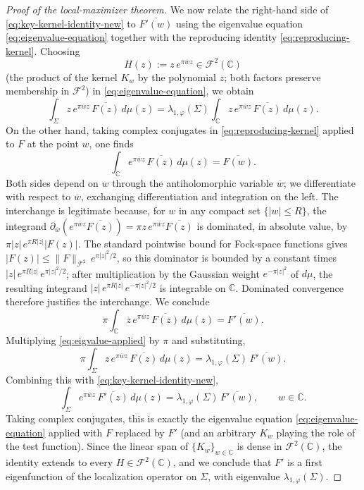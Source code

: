 \documentclass[a4paper,11pt,reqno]{amsart}
\numberwithin{equation}{section}
\theoremstyle{plain} %
\theoremstyle{definition} %
\theoremstyle{remark}
\newcommand{\C}{\mathbb{C}}
\begin{document}
\begin{proof}[Proof of the local-maximizer theorem]
We now relate the right-hand side of \eqref{eq:key-kernel-identity-new} to
\(\overline{F'(w)}\) using the eigenvalue equation
\eqref{eq:eigenvalue-equation} together with the reproducing identity
\eqref{eq:reproducing-kernel}. Choosing
\[
H(z):=z\,e^{\pi\overline w z}\in \mathcal F^2(\C)
\]
(the product of the kernel \(K_w\) by the polynomial \(z\); both factors
preserve membership in \(\mathcal F^2\)) in \eqref{eq:eigenvalue-equation}, we
obtain
\begin{equation}\label{eq:eigvalue-applied}
\int_\Sigma z\, e^{\pi \overline wz}\,\overline{F(z)}\,d\mu(z)
=
\lambda_{1,\varphi}(\Sigma)\int_\C z\, e^{\pi \overline wz}\,\overline{F(z)}\,d\mu(z).
\end{equation}
On the other hand, taking complex conjugates in \eqref{eq:reproducing-kernel}
applied to \(F\) at the point \(w\), one finds
\[
\int_\C e^{\pi \overline wz}\,\overline{F(z)}\,d\mu(z)=\overline{F(w)}.
\]
Both sides depend on \(w\) through the antiholomorphic variable
\(\overline w\); we differentiate with respect to \(\overline w\), exchanging
differentiation and integration on the left. The interchange is legitimate
because, for \(w\) in any compact set \(\{|w|\le R\}\), the integrand
\(\partial_{\overline w}(e^{\pi\overline wz}\overline{F(z)})
=\pi z\,e^{\pi\overline wz}\overline{F(z)}\) is dominated, in absolute
value, by \(\pi |z|\,e^{\pi R|z|}|F(z)|\). The standard pointwise bound for
Fock-space functions gives \(|F(z)|\le\|F\|_{\mathcal F^2}\,e^{\pi |z|^2/2}\),
so this dominator is bounded by a constant times
\(|z|\,e^{\pi R|z|}\,e^{\pi|z|^2/2}\); after multiplication by the Gaussian
weight \(e^{-\pi|z|^2}\) of \(d\mu\), the resulting integrand
\(|z|\,e^{\pi R|z|}\,e^{-\pi |z|^2/2}\) is integrable on \(\C\). Dominated
convergence therefore justifies the interchange. We conclude
\[
\pi\int_\C z\, e^{\pi \overline wz}\,\overline{F(z)}\,d\mu(z)
=
\overline{F'(w)}.
\]
Multiplying \eqref{eq:eigvalue-applied} by \(\pi\) and substituting,
\[
\pi\int_\Sigma z\, e^{\pi \overline wz}\,\overline{F(z)}\,d\mu(z)
=
\lambda_{1,\varphi}(\Sigma)\,\overline{F'(w)}.
\]
Combining this with \eqref{eq:key-kernel-identity-new},
\[
\int_\Sigma e^{\pi \overline wz}\,\overline{F'(z)}\,d\mu(z)
=
\lambda_{1,\varphi}(\Sigma)\,\overline{F'(w)},
\qquad w\in \C.
\]
Taking complex conjugates, this is exactly the eigenvalue equation
\eqref{eq:eigenvalue-equation} applied with \(F\) replaced by \(F'\) (and an
arbitrary \(K_w\) playing the role of the test function). Since the linear
span of \(\{K_w\}_{w\in\C}\) is dense in \(\mathcal F^2(\C)\), the identity
extends to every \(H\in\mathcal F^2(\C)\), and we conclude that \(F'\) is a
first eigenfunction of the localization operator on \(\Sigma\), with eigenvalue
\(\lambda_{1,\varphi}(\Sigma)\).


\end{proof}
\end{document}
